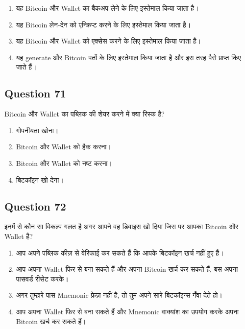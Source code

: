 \documentclass[12pt,a4paper]{article}
\begin{document}
\begin{enumerate}[label=\Alph*., leftmargin=*]
\item यह Bitcoin और Wallet का बैकअप लेने के लिए इस्तेमाल किया जाता है।
\item यह Bitcoin लेन-देन को एन्क्रिप्ट करने के लिए इस्तेमाल किया जाता है।
\item यह Bitcoin और Wallet को एक्सेस करने के लिए इस्तेमाल किया जाता है।
\item यह generate और Bitcoin पतों के लिए इस्तेमाल किया जाता है और इस तरह पैसे प्राप्त किए जाते हैं।
\end{enumerate}

\bigskip


\subsection*{Question 71}
Bitcoin और Wallet का पब्लिक की शेयर करने में क्या रिस्क है?

\begin{enumerate}[label=\Alph*., leftmargin=*]
\item गोपनीयता खोना।
\item Bitcoin और Wallet को हैक करना।
\item Bitcoin और Wallet को नष्ट करना।
\item बिटकॉइन खो देना।
\end{enumerate}

\bigskip


\subsection*{Question 72}
इनमें से कौन सा विकल्प गलत है अगर आपने वह डिवाइस खो दिया जिस पर आपका Bitcoin और Wallet है?

\begin{enumerate}[label=\Alph*., leftmargin=*]
\item आप अपने पब्लिक कीज़ से वेरिफाई कर सकते हैं कि आपके बिटकॉइन खर्च नहीं हुए हैं।
\item आप अपना Wallet फिर से बना सकते हैं और अपना Bitcoin खर्च कर सकते हैं, बस अपना पासवर्ड रीसेट करके।
\item अगर तुम्हारे पास Mnemonic फ्रेज़ नहीं है, तो तुम अपने सारे बिटकॉइन्स गँवा देते हो।
\item आप अपना Wallet फिर से बना सकते हैं और Mnemonic वाक्यांश का उपयोग करके अपना Bitcoin खर्च कर सकते हैं।
\end{enumerate}

\bigskip
\end{document}
